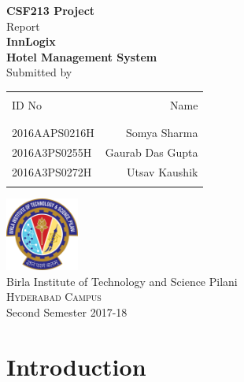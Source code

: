 \documentclass{scrreprt}
\date{}
\begin{document}
\begin{titlepage}

\begin{center}

\textup{\small {\bf CSF213 Project} \\ Report}\\[0.2in]


\Large \textbf {InnLogix\\Hotel Management System}\\[0.5in]


\normalsize Submitted by \\
\begin{table}[h]
\centering
\begin{tabular}{lr}\hline \\
ID No & Name \\ \\ \hline
\\
2016AAPS0216H & Somya Sharma \\
2016A3PS0255H & Gaurab Das Gupta \\ 
2016A3PS0272H & Utsav Kaushik\\ \\ \hline 
\end{tabular}
\end{table}

\vspace{4cm}

\includegraphics[width=0.18\textwidth]{logo}\\[0.1in]
\Large{Birla Institute of Technology and Science Pilani}\\
\normalsize
\textsc{Hyderabad Campus}
\vspace{0.2cm}\\
Second Semester 2017-18

\end{center}

\end{titlepage}

\tableofcontents


\chapter{Introduction}
\end{document}
